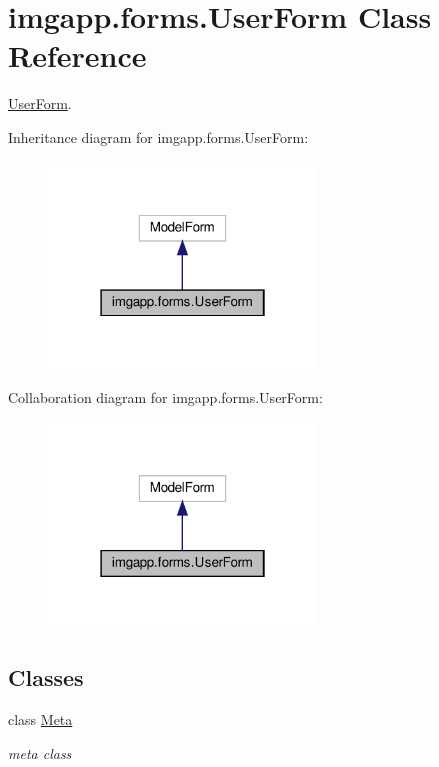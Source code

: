 \hypertarget{classimgapp_1_1forms_1_1UserForm}{}\section{imgapp.\+forms.\+User\+Form Class Reference}
\label{classimgapp_1_1forms_1_1UserForm}


\hyperlink{classimgapp_1_1forms_1_1UserForm}{User\+Form}.  




Inheritance diagram for imgapp.\+forms.\+User\+Form\+:
\nopagebreak
\begin{figure}[H]
\begin{center}
\leavevmode
\includegraphics[width=202pt]{classimgapp_1_1forms_1_1UserForm__inherit__graph}
\end{center}
\end{figure}


Collaboration diagram for imgapp.\+forms.\+User\+Form\+:
\nopagebreak
\begin{figure}[H]
\begin{center}
\leavevmode
\includegraphics[width=202pt]{classimgapp_1_1forms_1_1UserForm__coll__graph}
\end{center}
\end{figure}
\subsection*{Classes}
\begin{DoxyCompactItemize}
\item 
class \hyperlink{classimgapp_1_1forms_1_1UserForm_1_1Meta}{Meta}
\begin{DoxyCompactList}\small\item\em meta class \end{DoxyCompactList}\end{DoxyCompactItemize}


